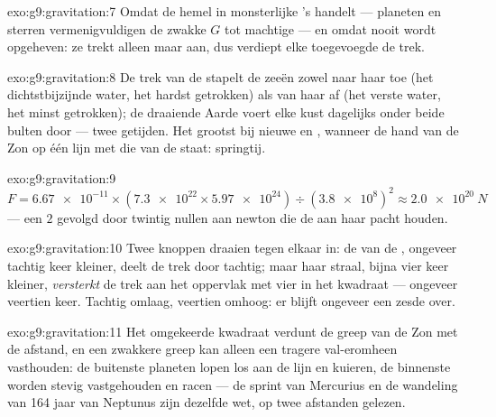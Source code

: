 \begin{solution}{exo:g9:gravitation:7}
Omdat de hemel in monsterlijke 's handelt ---
planeten en sterren vermenigvuldigen de zwakke $G$
tot machtige  --- en omdat
 nooit wordt opgeheven: ze
trekt alleen maar aan, dus verdiept elke
toegevoegde  de trek.
\end{solution}

\begin{solution}{exo:g9:gravitation:8}
De trek van de  stapelt de zeeën zowel naar haar toe (het
dichtstbijzijnde water, het hardst getrokken) als van haar af (het
verste water, het minst getrokken); de draaiende Aarde voert elke kust
dagelijks onder beide bulten door --- twee getijden. Het grootst bij
nieuwe en , wanneer de hand van de Zon op één lijn met
die van de  staat: springtij.
\end{solution}

\begin{solution}{exo:g9:gravitation:9}
$F = \num{6.67e-11} \times (\num{7.3e22} \times \num{5.97e24}) \div
(\num{3.8e8})^2 \approx \qty{2.0e20}{N}$ --- een $2$ gevolgd door
twintig nullen aan newton die de  aan haar pacht houden.
\end{solution}

\begin{solution}{exo:g9:gravitation:10}
Twee knoppen draaien tegen elkaar in: de  van de
, ongeveer tachtig keer kleiner, deelt de trek door tachtig;
maar haar straal, bijna vier keer kleiner, \emph{versterkt} de trek aan
het oppervlak met vier in het kwadraat --- ongeveer veertien keer.
Tachtig omlaag, veertien omhoog: er blijft ongeveer een zesde over.
\end{solution}

\begin{solution}{exo:g9:gravitation:11}
Het omgekeerde kwadraat verdunt de greep van de Zon met de afstand, en
een zwakkere greep kan alleen een tragere val-eromheen vasthouden: de
buitenste planeten lopen los aan de lijn en kuieren, de binnenste
worden stevig vastgehouden en racen --- de sprint van Mercurius en de
wandeling van 164 jaar van Neptunus zijn dezelfde wet, op twee
afstanden gelezen.
\end{solution}

